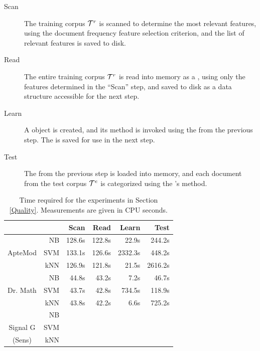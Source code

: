 \begin{description}
\item[Scan] The training corpus $\mathcal{T}^r$ is scanned to determine the
  most relevant features, using the document frequency feature
  selection criterion, and the list of relevant features is saved to
  disk.
\item[Read] The entire training corpus $\mathcal{T}^r$ is read into memory as
  a , using only the features determined in the
  ``Scan'' step, and saved to disk as a data structure accessible for the
  next step.
\item[Learn] A  object is created, and its
   method is invoked using the  from
  the previous step.  The  is saved for use in the next
  step.
\item[Test] The  from the previous step is loaded into
  memory, and each document from the test corpus $\mathcal{T}^e$ is
  categorized using the 's  method.
\end{description}

\begin{table}
\begin{center}
\begin{tabular}{|c|r|r r r r|}
\cline{3-6}
\multicolumn{2}{c|}{}
                 &  Scan  &  Read   &  Learn  &  Test   \\ \hline
           & NB  & 128.6s & 122.8s  &   22.9s &  244.2s \\
ApteMod    & SVM & 133.1s & 126.6s  & 2332.3s &  448.2s \\
           & kNN & 126.9s & 121.8s  &   21.5s & 2616.2s \\ \hline
           & NB  &  44.8s &  43.2s  &    7.2s &   46.7s \\
Dr. Math   & SVM &  43.7s &  42.8s  &  734.5s &  118.9s \\
           & kNN &  43.8s &  42.2s  &    6.6s &  725.2s \\ \hline
           & NB  &   &   &   & \\
Signal G   & SVM &   &   &   & \\
  (Sens)   & kNN &   &   &   & \\ \hline
\end{tabular}
\end{center}
\caption[Time required for the experiments in Section \ref{Quality}]
 {Time required for the experiments in Section \ref{Quality}.
  Measurements are given in CPU seconds.}
\label{eval-time}
\end{table}

